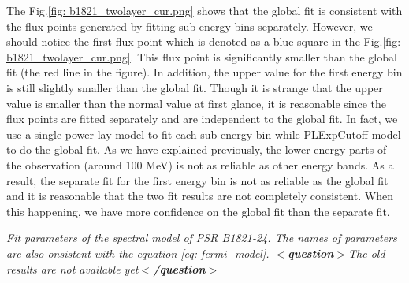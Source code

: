 \documentclass[12pt]{report}
\newcommand{\mycaption}[1]{\caption{\textit{\footnotesize #1}}}
\newcommand{\singleFig}[3]{
 \begin{figure}[!ht]
  \centering
  \texttt{[image: /Users/grewwc/Desktop/Thesis/\#1]}
  \mycaption{#3}
 \label{fig: #1}
 \end{figure}
}
\newcommand{\question}[1]{
  $<$\textbf{question}$>$#1$<$\textbf{/question}$>$
}
\newcommand{\change}[1]{
  $<$\colorbox{red}{\textbf{change}}$>$#1$<$\colorbox{red}{\textbf{/change}}$>$
}
\begin{document}
            The Fig.\ref{fig: b1821_twolayer_cur.png} shows that the global fit is consistent with 
            the flux points generated by fitting sub-energy bins separately. However, 
            we should notice the first flux point 
            which is denoted as a blue square in the Fig.\ref{fig: b1821_twolayer_cur.png}. This 
            flux point is significantly smaller than the global fit (the red line in the figure). 
            In addition, the upper value for the first energy bin is still slightly smaller than the global fit. 
            Though it is strange that the upper value is smaller than the normal value at first glance, 
            it is reasonable since the flux points are fitted separately and are independent to 
            the global fit. In fact, we use a single power-lay model to fit each sub-energy bin while PLExpCutoff
            model to do the global fit. As we have explained previously, the lower energy parts of the 
            observation (around 100 MeV) is not as reliable as other energy bands. As a result, the separate 
            fit for the first energy bin
            is not as reliable as the global fit and it is reasonable that the two fit results are not completely
            consistent. When this happening, we have more confidence on the global fit than the separate fit.
            
            \begin{table}[!ht]
              \centering
                \mycaption{Fit parameters of the spectral model of PSR B1821-24. 
                  The names of parameters are also onsistent with the equation
                  \ref{eq: fermi_model}. \question{The old results are not available yet}}
                \label{table: b1821_fit_result}        
            \end{table}  
            \vspace{1cm}
\end{document}
